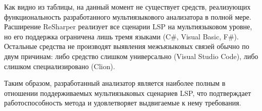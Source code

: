 Как видно из таблицы, на данный момент не существует средств, реализующих функциональность разработанного мультиязыкового
анализатора в полной мере. Расширение ReSharper реализует все сценарии LSP на мультиязыковом уровне, но
его поддержка ограничена лишь тремя языками (C\#, Visual Basic, F\#). Остальные средства не 
производят выявления межъязыковых связей обычно по двум причинам: либо средство слишком универсально
(Visual Studio Code), либо слишком специализировано (Clion).

Таким образом, разработанный анализатор является наиболее полным в отношении
поддерживаемых мультиязыковых сценариев LSP, что подтверждает работоспособность
метода и удовлетворяет выдвигаемые к нему требования.

\clearpage
